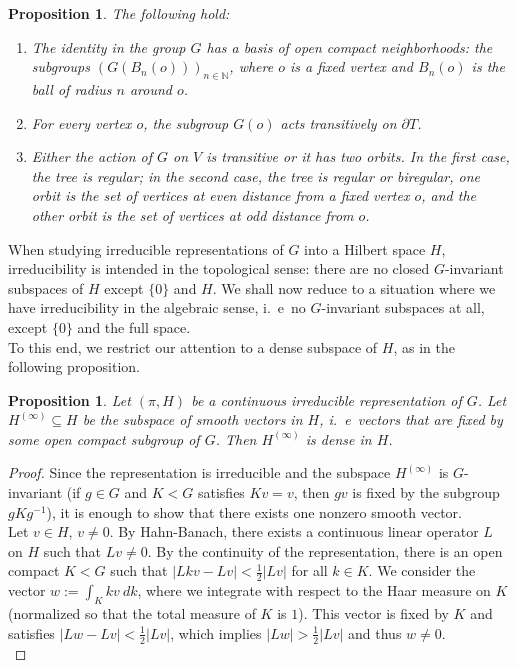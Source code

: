 \documentclass{article}
\theoremstyle{definition}
\theoremstyle{remark}
\theoremstyle{plain}
\newtheorem{prp}[dfn]{Proposition}
\begin{document}
\begin{prp} \label{props}
The following hold:
\begin{enumerate}[label=(\alph*)]
    \item The identity in the group $G$ has a basis of open compact neighborhoods: the subgroups $(G(B_n(o)))_{n\in\mathbb{N}}$, where $o$ is a fixed vertex and $B_n(o)$ is the ball of radius $n$ around $o$.
    \item For every vertex $o$, the subgroup $G(o)$ acts transitively on $\partial T$.
    \item Either the action of $G$ on $V$ is transitive or it has two orbits. In the first case, the tree is regular; in the second case, the tree is regular or biregular, one orbit is the set of vertices at even distance from a fixed vertex $o$, and the other orbit is the set of vertices at odd distance from $o$. \\
\end{enumerate}
\end{prp}

When studying irreducible representations of $G$ into a Hilbert space $H$, irreducibility is intended in the topological sense: there are no closed $G$-invariant subspaces of $H$ except $\{0\}$ and $H$. We shall now reduce to a situation where we have irreducibility in the algebraic sense, i.~e~no $G$-invariant subspaces at all, except $\{0\}$ and the full space. \\

To this end, we restrict our attention to a dense subspace of $H$, as in the following proposition. \\

\begin{prp} \label{smooth}
Let $(\pi,H)$ be a continuous irreducible representation of $G$. Let $H^{(\infty)}\subseteq H$ be the subspace of smooth vectors in $H$, i.~e~vectors that are fixed by some open compact subgroup of $G$. Then $H^{(\infty)}$ is dense in $H$.
\end{prp}

\begin{proof}
Since the representation is irreducible and the subspace $H^{(\infty)}$ is $G$-invariant (if $g\in G$ and $K<G$ satisfies $Kv=v$, then $gv$ is fixed by the subgroup $gKg^{-1}$), it is enough to show that there exists one nonzero smooth vector. \\

Let $v\in H$, $v\neq 0$. By Hahn-Banach, there exists a continuous linear operator $L$ on $H$ such that $Lv\neq 0$. By the continuity of the representation, there is an open compact $K<G$ such that $\vert Lkv-Lv\vert<\frac{1}{2}\vert Lv\vert$ for all $k\in K$. We consider the vector $w:=\int_K kv\ dk$, where we integrate with respect to the Haar measure on $K$ (normalized so that the total measure of $K$ is $1$). This vector is fixed by $K$ and satisfies $\vert Lw-Lv\vert<\frac{1}{2}\vert Lv\vert$, which implies $\vert Lw\vert>\frac{1}{2}\vert Lv\vert$ and thus $w\neq 0$. \\
\end{proof}
\end{document}
